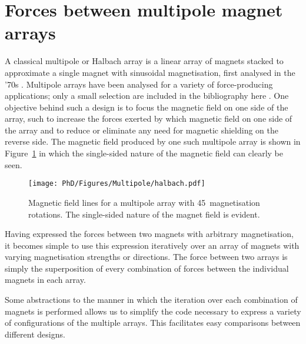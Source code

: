 \section{Forces between multipole magnet arrays}

A classical multipole or Halbach array is a linear array of magnets stacked to approximate a single magnet with sinusoidal magnetisation, first analysed in the '70s \parencite{halbach1981,shute2000}. Multipole arrays have been analysed for a variety of force-producing applications; only a small selection are included in the bibliography here \parencite{lee2004-mx,robertson2005,rovers2009-ietm}. One objective behind such a design is to focus the magnetic field on one side of the array, such to increase the forces exerted by which magnetic field on one side of the array and to reduce or eliminate any need for magnetic shielding on the reverse side. The magnetic field produced by one such multipole array is shown in Figure~\ref{halbach} in which the single-sided nature of the magnetic field can clearly be seen.

\begin{figure}
\centering
\texttt{[image: PhD/Figures/Multipole/halbach.pdf]}
\caption{Magnetic field lines for a multipole array with 45\textdegree\ magnetisation rotations. The single-sided nature of the magnet field is evident.}
\label{halbach}
\end{figure}

Having expressed the forces between two magnets with arbitrary magnetisation, it becomes simple to use this expression iteratively over an array of magnets with varying magnetisation strengths or directions. The force between two arrays is simply the superposition of every combination of forces between the individual magnets in each array.

Some abstractions to the manner in which the iteration over each combination of magnets is performed allows us to simplify the code necessary to express a variety of configurations of the multiple arrays. This facilitates easy comparisons between different designs.

